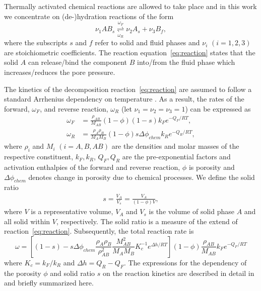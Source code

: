\documentclass[]{scrreprt}
\begin{document}
Thermally activated chemical reactions are allowed to take place and
in this work we concentrate on (de-)hydration reactions of the form
\begin{equation}
  \label{eq:reaction}
  \nu_1 AB_{s} 
  \overset{\omega_F}{\underset{\omega_R}{\rightleftharpoons}} \nu_2 A_{s} + \nu_3 B_{f},
\end{equation} 
where the subscripts $s$ and $f$ refer to solid and fluid phases and $\nu_i$
$(i=1,2,3)$ are stoichiometric coefficients.  The reaction
equation~\eqref{eq:reaction} states that the solid $A$ can release/bind the
component $B$ into/from the fluid phase which increases/reduces the pore pressure.

The kinetics of the decomposition reaction~\eqref{eq:reaction} are assumed
to follow a standard Arrhenius dependency on temperature 
\citep{Poulet2014}. As a result, the rates of the forward, $\omega_F$, and
reverse reaction, $\omega_R$ (let $\nu_1=\nu_2=\nu_3=1$) can
be expressed as \citep{Alevizos2014}
\begin{subequations}
\label{eq:reaction_rates_txt}
\begin{align}
  \omega_F &=  \frac{\rho_{AB}}{M_{AB}} (1 - \phi)(1 - s)  k_F e^{-Q_F/RT}, \\
  \omega_R &=  \frac{\rho_{A} \rho_{B}}{M_A M_B} (1 - \phi) s \Delta\phi_{chem}
  k_R e^{-Q_R/RT},
\end{align}
\end{subequations}
where $\rho_i$ and $M_i$ $(i = A, B, AB)$ are the densities and molar masses of
the respective constituent,
$k_F,k_R$, $Q_F,Q_R$ are the pre-exponential factors and activation enthalpies
of the forward and reverse reaction,
$\phi$ is porosity and $\Delta\phi_{chem}$ denotes change in porosity due to 
chemical processes. We define the solid ratio
\begin{eqnarray}
    \label{eq:s}
    s = \frac{V_{A}}{V_s} = \frac{V_{A}}{(1-\phi) V},
\end{eqnarray}
where $V$ is a representative volume, $V_A$ and $V_s$ is the volume of solid
phase $A$ and all solid within $V$, respectively. The solid ratio is a measure
of the extend of reaction~\eqref{eq:reaction}. Subsequently, the total
reaction rate is
\begin{equation}
 \label{eq:reaction_rate_total}
\omega = \left[(1 - s) - s  \Delta \phi_{chem} \frac{\rho_{A}
\rho_{B}}{\rho^2_{AB}} \frac{M^2_{AB}}{M_A M_B} K^{-1}_c e^{\Delta h/RT}
\right] (1 - \phi) \frac{\rho_{AB}}{M_{AB}} k_F e^{-Q_F/RT}
\end{equation}
where $K_c = k_F/k_R$ and $\Delta h = Q_R - Q_F$.  The expressions for the
dependency of the porosity $\phi$ and solid ratio $s$ on the reaction kinetics
are described in detail in \cite{Alevizos2014} and briefly summarized here.
\end{document}
